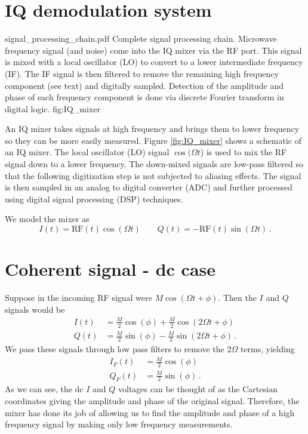 \section{IQ demodulation system}

{signal_processing_chain.pdf}
{Complete signal processing chain. Microwave frequency signal (and noise) come into the IQ mixer via the RF port. This signal is mixed with a local oscillator (LO) to convert to a lower intermediate frequency (IF). The IF signal is then filtered to remove the remaining high frequency component (see text) and digitally sampled. Detection of the amplitude and phase of each frequency component is done via discrete Fourier transform in digital logic.}
{fig:IQ_mixer}

An IQ mixer takes signals at high frequency and brings them to lower frequency so they can be more easily measured.
Figure \ref{fig:IQ_mixer} shows a schematic of an IQ mixer.
The local oscillator (LO) signal $\cos(\Omega t$) is used to mix the RF signal down to a lower frequency.
The down-mixed signals are low-pass filtered so that the following digitization step is not subjected to aliasing effects.
The signal is then sampled in an analog to digital converter (ADC) and further processed using digital signal processing (DSP) techniques.

We model the mixer as
\begin{equation}
I(t) = \text{RF}(t) \cos(\Omega t) \qquad Q(t) = - \text{RF}(t) \sin(\Omega t) \, .
\end{equation}

\section{Coherent signal - dc case}

Suppose in the incoming RF signal were $M \cos(\Omega t + \phi)$.
Then the $I$ and $Q$ signals would be
\begin{align}
I(t) &= \frac{M}{2} \cos(\phi) + \frac{M}{2} \cos(2\Omega t + \phi) \\
Q(t) &= \frac{M}{2} \sin(\phi) - \frac{M}{2} \sin(2\Omega t + \phi) \, .
\end{align}
We pass these signals through low pass filters to remove the $2 \Omega$ terms, yielding
\begin{align}
I_F(t) &= \frac{M}{2} \cos(\phi) \\
Q_F(t) &= \frac{M}{2} \sin(\phi) \, .
\end{align}
As we can see, the dc $I$ and $Q$ voltages can be thought of as the Cartesian coordinates giving the amplitude and phase of the original signal.
Therefore, the mixer has done its job of allowing us to find the amplitude and phase of a high frequency signal by making only low frequency measurements.


